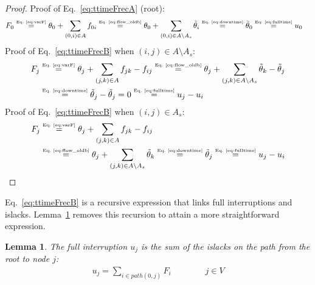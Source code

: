 \documentclass{article}
\newtheorem{lemma}{Lemma}
\begin{document}
\begin{proof}
    Proof of Eq.~\eqref{eq:ttimeFrecA} (root):
    \begin{align}
	    \displaystyle
	    F_0 &\stackrel{\mbox{\tiny Eq.~\ref{eq:varF}}}{=} \theta_0 + \sum_{(0,i) \in A}{f_{0i}} \stackrel{\mbox{\tiny Eq.~\ref{eq:flow_oldb}}}{=} \theta_0 + \sum_{(0,i) \in A \setminus A_{s}}{\tilde{\theta}_{i}} \stackrel{\mbox{\tiny Eq.~\ref{eq:downtime}}}{=} \tilde{\theta}_{0} \stackrel{\mbox{\tiny Eq.~\ref{eq:fulltime}}}{=} u_0 \nonumber
    \end{align}
    Proof of Eq.~\eqref{eq:ttimeFrecB} when $(i,j) \in A \setminus A_{s}$:
    \begin{align}  
	    \displaystyle
	    F_j &\stackrel{\mbox{\tiny Eq.~\ref{eq:varF}}}{=} \displaystyle \theta_j + \sum_{(j,k) \in A}{f_{jk}} - f_{ij} \stackrel{\mbox{\tiny Eq.~\ref{eq:flow_oldb}}}{=} \theta_j +\sum_{(j,k) \in A \setminus A_{s}}{\tilde{\theta}_{k}} - \tilde{\theta}_{j} \nonumber \\
	    &\stackrel{\mbox{\tiny Eq.~\ref{eq:downtime}}}{=} \tilde{\theta}_{j} - \tilde{\theta}_{j} = 0 \stackrel{\mbox{\tiny Eq.~\ref{eq:fulltime}}}{=} u_j - u_i \nonumber	
    \end{align}
    Proof of Eq.~\eqref{eq:ttimeFrecB} when $(i,j) \in A_{s}$:
    \begin{align}  
	    \displaystyle
        F_j &\stackrel{\mbox{\tiny Eq.~\ref{eq:varF}}}{=} \displaystyle \theta_j + \sum_{(j,k) \in A}{f_{jk}} - f_{ij} \nonumber  \\
        &\stackrel{\mbox{\tiny Eq.~\ref{eq:flow_oldb}}}{=} \theta_j +\sum_{(j,k) \in A \setminus A_{s}}{\tilde{\theta}_{k}} \stackrel{\mbox{\tiny Eq.~\ref{eq:downtime}}}{=} \tilde{\theta}_{j} \stackrel{\mbox{\tiny Eq.~\ref{eq:fulltime}}}{=} u_j - u_i \nonumber
    \end{align}
\end{proof}

Eq.~\eqref{eq:ttimeFrecB} is a recursive expression that links full interruptions and islacks. Lemma~\ref{lemma2} removes this recursion to attain a more straightforward expression.

\begin{lemma} \label{lemma2}
	The full interruption $u_j$ is the sum of the islacks on the path from the root to node $j$:
	\begin{align} \label{eq:ttimeF2}
		\displaystyle u_j = \sum_{i \in path(0,j)}{F_i} \qquad \qquad j \in V
	\end{align}
\end{lemma}
\end{document}
